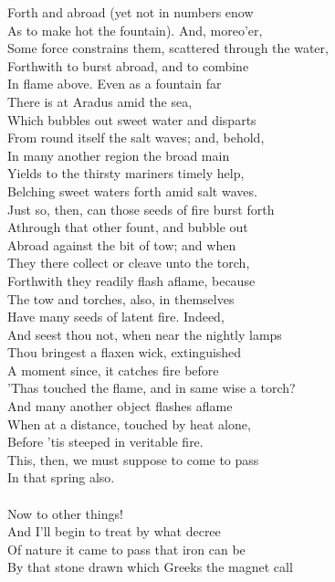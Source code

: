 Forth and abroad (yet not in numbers enow\\
As to make hot the fountain). And, moreo'er,\\
Some force constrains them, scattered through the water,\\
Forthwith to burst abroad, and to combine\\
In flame above. Even as a fountain far\\
There is at Aradus amid the sea,\\
Which bubbles out sweet water and disparts\\
From round itself the salt waves; and, behold,\\
In many another region the broad main\\
Yields to the thirsty mariners timely help,\\
Belching sweet waters forth amid salt waves.\\
Just so, then, can those seeds of fire burst forth\\
Athrough that other fount, and bubble out\\
Abroad against the bit of tow; and when\\
They there collect or cleave unto the torch,\\
Forthwith they readily flash aflame, because\\
The tow and torches, also, in themselves\\
Have many seeds of latent fire. Indeed,\\
And seest thou not, when near the nightly lamps\\
Thou bringest a flaxen wick, extinguished\\
A moment since, it catches fire before\\
'Thas touched the flame, and in same wise a torch?\\
And many another object flashes aflame\\
When at a distance, touched by heat alone,\\
Before 'tis steeped in veritable fire.\\
This, then, we must suppose to come to pass\\
In that spring also.\\
\\
Now to other things!\\
And I'll begin to treat by what decree\\
Of nature it came to pass that iron can be\\
By that stone drawn which Greeks the magnet call\\
